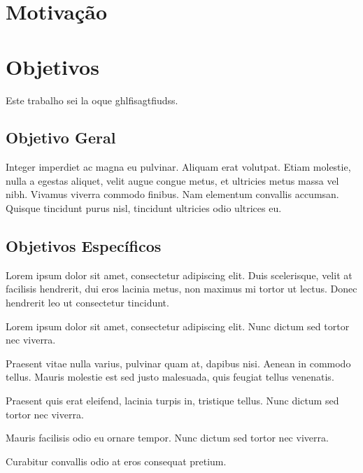 \section{Motivação}
\label{sec:motivacao}



\section{Objetivos}
\label{sec:objetivos}

Este trabalho sei la oque ghlfisagtfiudss.

\subsection{Objetivo Geral}
\label{sec:objetivo-geral}

Integer imperdiet ac magna eu pulvinar. Aliquam erat volutpat. Etiam molestie, nulla a egestas aliquet, velit augue congue metus, et ultricies metus massa vel nibh. Vivamus viverra commodo finibus. Nam elementum convallis accumsan. Quisque tincidunt purus nisl, tincidunt ultricies odio ultrices eu.

\subsection{Objetivos Específicos}
\label{sec:objetivos-especificos}

Lorem ipsum dolor sit amet, consectetur adipiscing elit. Duis scelerisque, velit at facilisis hendrerit, dui eros lacinia metus, non maximus mi tortor ut lectus. Donec hendrerit leo ut consectetur tincidunt. 

	\begin{alineas}
		\item Lorem ipsum dolor sit amet, consectetur adipiscing elit. Nunc dictum sed tortor nec viverra.
		\item Praesent vitae nulla varius, pulvinar quam at, dapibus nisi. Aenean in commodo tellus. Mauris molestie est sed justo malesuada, quis feugiat tellus venenatis.
		\item Praesent quis erat eleifend, lacinia turpis in, tristique tellus. Nunc dictum sed tortor nec viverra.
		\item Mauris facilisis odio eu ornare tempor. Nunc dictum sed tortor nec viverra.
		\item Curabitur convallis odio at eros consequat pretium.
	\end{alineas}
